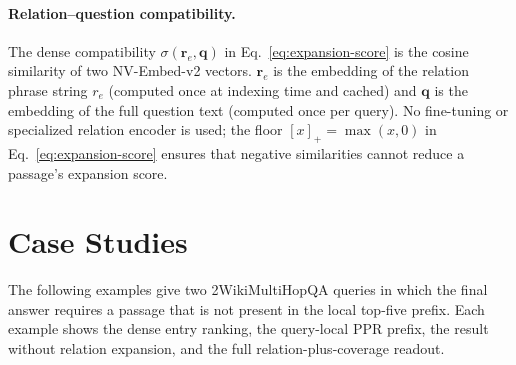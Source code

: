 \paragraph{Relation--question compatibility.}
The dense compatibility $\sigma(\mathbf{r}_e, \mathbf{q})$ in
Eq.~\ref{eq:expansion-score} is the cosine similarity of two
NV-Embed-v2 vectors. $\mathbf{r}_e$ is the embedding of the relation
phrase string $r_e$ (computed once at indexing time and cached) and
$\mathbf{q}$ is the embedding of the full question text (computed
once per query). No fine-tuning or specialized relation encoder is
used; the floor $[x]_{+}=\max(x,0)$ in Eq.~\ref{eq:expansion-score}
ensures that negative similarities cannot reduce a passage's
expansion score.

\section{Case Studies}
\label{app:case-study}

The following examples give two 2WikiMultiHopQA queries in which the
final answer requires a passage that is not present in the local
top-five prefix. Each example shows the dense entry ranking, the
query-local PPR prefix, the result without relation expansion, and the
full relation-plus-coverage readout.

